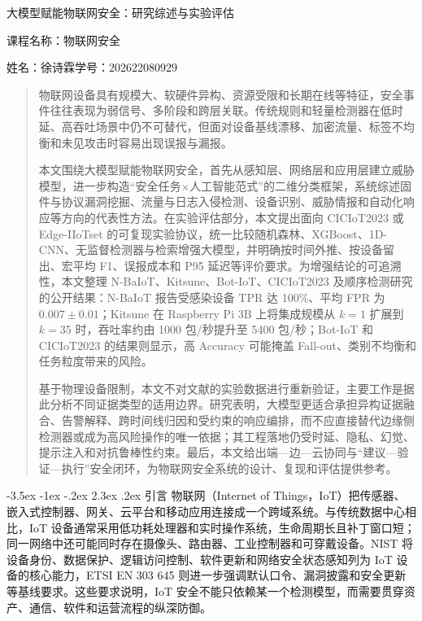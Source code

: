 \documentclass[twoside,withoutpreface,bwprint]{cumcmthesis}
\makeatletter
\newcommand{\reporttitle}{大模型赋能物联网安全：研究综述与实验评估}
\newcommand{\coursename}{物联网安全}
\newcommand{\studentname}{徐诗霖}
\newcommand{\studentid}{202622080929}
\renewcommand\section{\@startsection{section}{1}{\z@}%
    {-3.5ex \@plus -1ex \@minus -.2ex}%
    {2.3ex \@plus.2ex}%
    {\centering\normalfont\heiti\zihao{4}}}
\renewcommand{\maketitle}{%
    \setcounter{page}{1}%
    \begin{center}
        {\heiti\zihao{3}\reporttitle\par}
        \vspace{0.5em}
        {\songti\zihao{-4}课程名称：\coursename\par}
        {\songti\zihao{-4}姓名：\studentname\hspace{2em}学号：\studentid\par}
    \end{center}
    \vspace{1ex}}
\makeatother
\begin{document}
\begingroup
\pagestyle{empty}
\makeatletter
\let\ps@plain\ps@empty
\makeatother
\tableofcontents  %
\clearpage
\endgroup

\maketitle


\begin{abstract}
物联网设备具有规模大、软硬件异构、资源受限和长期在线等特征，安全事件往往表现为弱信号、多阶段和跨层关联。传统规则和轻量检测器在低时延、高吞吐场景中仍不可替代，但面对设备基线漂移、加密流量、标签不均衡和未见攻击时容易出现误报与漏报。

本文围绕大模型赋能物联网安全，首先从感知层、网络层和应用层建立威胁模型，进一步构造“安全任务$\times$人工智能范式”的二维分类框架，系统综述固件与协议漏洞挖掘、流量与日志入侵检测、设备识别、威胁情报和自动化响应等方向的代表性方法。在实验评估部分，本文提出面向 CICIoT2023 或 Edge-IIoTset 的可复现实验协议，统一比较随机森林、XGBoost、1D-CNN、无监督检测器与检索增强大模型，并明确按时间外推、按设备留出、宏平均 F1、误报成本和 P95 延迟等评价要求。为增强结论的可追溯性，本文整理 N-BaIoT、Kitsune、Bot-IoT、CICIoT2023 及顺序检测研究的公开结果：N-BaIoT 报告受感染设备 TPR 达 100\%、平均 FPR 为 $0.007\pm0.01$；Kitsune 在 Raspberry Pi 3B 上将集成规模从 $k=1$ 扩展到 $k=35$ 时，吞吐率约由 1000 包/秒提升至 5400 包/秒；Bot-IoT 和 CICIoT2023 的结果则显示，高 Accuracy 可能掩盖 Fall-out、类别不均衡和任务粒度带来的风险。

基于物理设备限制，本文不对文献的实验数据进行重新验证，主要工作是据此分析不同证据类型的适用边界。研究表明，大模型更适合承担异构证据融合、告警解释、跨时间线归因和受约束的响应编排，而不应直接替代边缘侧检测器或成为高风险操作的唯一依据；其工程落地仍受时延、隐私、幻觉、提示注入和对抗鲁棒性约束。最后，本文给出端—边—云协同与“建议—验证—执行”安全闭环，为物联网安全系统的设计、复现和评估提供参考。

\vspace{2mm}
\end{abstract}


\section{引言}
物联网（Internet of Things，IoT）把传感器、嵌入式控制器、网关、云平台和移动应用连接成一个跨域系统。与传统数据中心相比，IoT 设备通常采用低功耗处理器和实时操作系统，生命周期长且补丁窗口短；同一网络中还可能同时存在摄像头、路由器、工业控制器和可穿戴设备。NIST 将设备身份、数据保护、逻辑访问控制、软件更新和网络安全状态感知列为 IoT 设备的核心能力\cite{nist8259a}，ETSI EN 303 645 则进一步强调默认口令、漏洞披露和安全更新等基线要求\cite{etsi303645}。这些要求说明，IoT 安全不能只依赖某一个检测模型，而需要贯穿资产、通信、软件和运营流程的纵深防御。
\end{document}
